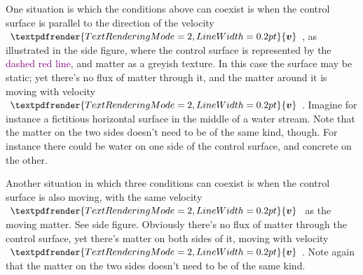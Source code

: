 \documentclass[a4paper,12pt,%
onecolumn,oneside,%
british%
]{memoir}
\renewcommand*{\bm}[1]{\textpdfrender{TextRenderingMode=2,LineWidth=0.2pt}{\boldsymbol{#1}}}
\renewcommand*{\|}[1][]{\nonscript\:#1\vert\nonscript\:\mathopen{}}
\newcommand*{\yv}{\bm{v}}
\begin{document}
%
%
One situation is which the conditions above can coexist is when the control surface is parallel to the direction of the velocity $\yv$, as illustrated in the side figure, where the control surface is represented by the \textcolor{purple}{dashed red line}, and matter as a \textcolor{midgrey}{greyish texture}. In this case the surface may be static; yet there's no flux of matter through it, and the matter around it is moving with velocity $\yv$. Imagine for instance a fictitious horizontal surface in the middle of a water stream. Note that the matter on the two sides doesn't need to be of the same kind, though. For instance there could be water on one side of the control surface, and concrete on the other.

Another situation in which three conditions can coexist is when the control surface is also moving, with the same velocity $\yv$ as the moving matter. See side figure. Obviously there's no flux of matter through the control surface, yet there's matter on both sides of it, moving with velocity $\yv$. Note again that the matter on the two sides doesn't need to be of the same kind.
%
%
\end{document}
